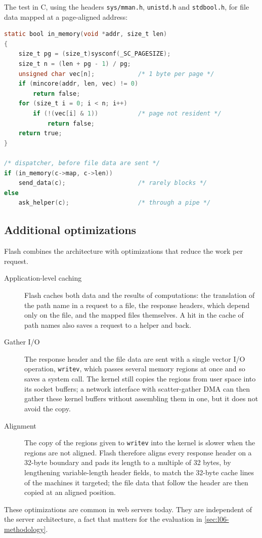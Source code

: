 \documentclass[../main.tex]{subfiles}
\begin{document}
\begin{example}
  The test in C, using the headers \texttt{sys/mman.h},
  \texttt{unistd.h} and \texttt{stdbool.h}, for file data mapped at a
  page-aligned address:
  \begin{lstlisting}[language=C, numbers=none]
static bool in_memory(void *addr, size_t len)
{
    size_t pg = (size_t)sysconf(_SC_PAGESIZE);
    size_t n = (len + pg - 1) / pg;
    unsigned char vec[n];            /* 1 byte per page */
    if (mincore(addr, len, vec) != 0)
        return false;
    for (size_t i = 0; i < n; i++)
        if (!(vec[i] & 1))           /* page not resident */
            return false;
    return true;
}

/* dispatcher, before file data are sent */
if (in_memory(c->map, c->len))
    send_data(c);                    /* rarely blocks */
else
    ask_helper(c);                   /* through a pipe */
\end{lstlisting}
\end{example}

\subsection{Additional optimizations}

Flash combines the architecture with optimizations that reduce the work per
request.
\begin{description}
  \item[Application-level caching] Flash caches both data and the results
    of computations: the translation of the path name in a request to a
    file, the response headers, which depend only on the file, and the
    mapped files themselves.  A hit in the cache of path names also saves a
    request to a helper and back.
  \item[Gather I/O] The response header and the file data are sent with a
    single vector I/O operation, \texttt{writev}, which passes several
    memory regions at once and so saves a system call.  The kernel still
    copies the regions from user space into its socket buffers; a network
    interface with scatter-gather DMA can then gather these kernel buffers
    without assembling them in one, but it does not avoid the
    copy.
  \item[Alignment] The copy of the regions given to \texttt{writev} into
    the kernel is slower when the regions are not aligned.  Flash therefore
    aligns every response header on a 32-byte boundary and pads its length
    to a multiple of 32 bytes, by lengthening variable-length header
    fields, to match the 32-byte cache lines of the machines it targeted;
    the file data that follow the header are then copied at an aligned
    position.
\end{description}
These optimizations are common in web servers today.
They are independent of the server architecture, a fact that matters for
the evaluation in \cref{sec:l06-methodology}.
\end{document}
